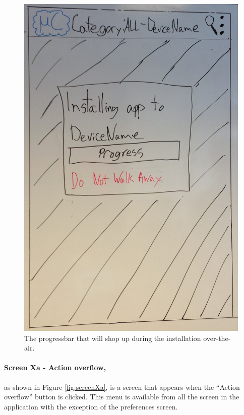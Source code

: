 \begin{figure}[H]
\centering
\includegraphics[scale=0.2]{images/Design_guide/Screen3a-ii.png}
\caption[Screen 3a-ii - Progress of installation]{The progressbar that will shop up during the installation over-the-air.}
\label{fig:screen3aii}
\end{figure}


\paragraph{Screen Xa - Action overflow,} as shown in Figure \ref{fig:screenXa}, is a screen that appears when the ``Action overflow'' button is clicked. This menu is available from all the screen in the application with the exception of the preferences screen.

